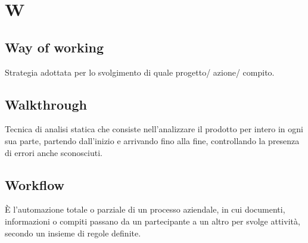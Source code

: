 \section{W}
	\subsection{Way of working}
		Strategia adottata per lo svolgimento di quale progetto/ azione/ compito.
	\subsection{Walkthrough} 
		Tecnica di analisi statica che consiste nell'analizzare il prodotto per intero in ogni sua parte, partendo dall’inizio e arrivando fino alla fine, controllando la presenza di errori anche sconosciuti.
	\subsection{Workflow}  
		È l’automazione totale o parziale di un processo aziendale, in cui documenti, informazioni o compiti passano da un partecipante a un altro per svolge attività, secondo un insieme di regole definite.
